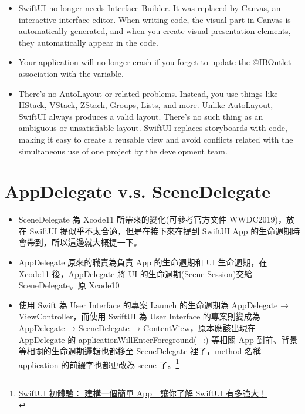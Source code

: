 \documentclass[a4paper,12pt]{article}
\begin{document}
\begin{enumerate}
\begin{itemize}
\item SwiftUI no longer needs Interface Builder. It was replaced by Canvas, an interactive interface editor. When writing code, the visual part in Canvas is automatically generated, and when you create visual presentation elements, they automatically appear in the code.\\
\item Your application will no longer crash if you forget to update the @IBOutlet association with the variable.\\
\item There’s no AutoLayout or related problems. Instead, you use things like HStack, VStack, ZStack, Groups, Lists, and more. Unlike AutoLayout, SwiftUI always produces a valid layout. There’s no such thing as an ambiguous or unsatisfiable layout. SwiftUI replaces storyboards with code, making it easy to create a reusable view and avoid conflicts related with the simultaneous use of one project by the development team.\\
\end{itemize}
\end{enumerate}

\section{AppDelegate v.s. SceneDelegate}
\label{sec:org95913a5}
\begin{itemize}
\item SceneDelegate 為 Xcode11 所帶來的變化(可參考官方文件 WWDC2019)，放在 SwiftUI 提似乎不太合適，但是在接下來在提到 SwiftUI App 的生命週期時會帶到，所以這邊就大概提一下。\\
\item AppDelegate 原來的職責為負責 App 的生命週期和 UI 生命週期，在 Xcode11 後，AppDelegate 將 UI 的生命週期(Scene Session)交給 SceneDelegate。原 Xcode10\\
\item 使用 Swift 為 User Interface 的專案 Launch 的生命週期為 AppDelegate → ViewController，而使用 SwiftUI 為 User Interface 的專案則變成為 AppDelegate → SceneDelegate → ContentView，原本應該出現在 AppDelegate 的 applicationWillEnterForeground(\_:) 等相關 App 到前、背景等相關的生命週期邏輯也都移至 SceneDelegate 裡了，method 名稱 application 的前綴字也都更改為 scene 了。\footnote{\href{https://www.appcoda.com.tw/swiftui-introduction/}{SwiftUI 初體驗： 建構一個簡單 App　讓你了解 SwiftUI 有多強大！}\\\label{orgd6a10cc}}\\
\end{itemize}
\end{document}
